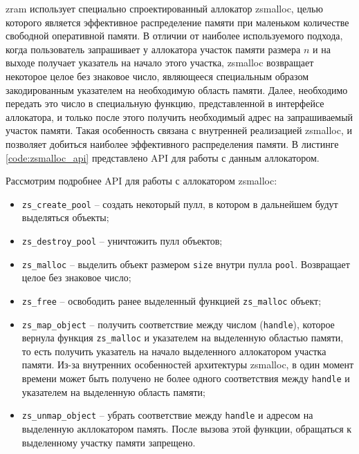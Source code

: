 \documentclass[12pt, a4paper]{article}
\begin{document}
zram использует специально спроектированный аллокатор zsmalloc, целью которого является эффективное распределение памяти при маленьком количестве свободной оперативной памяти. В отличии от наиболее используемого подхода, когда пользователь запрашивает у аллокатора участок памяти размера $n$ и на выходе получает указатель на начало этого участка, zsmalloc возвращает некоторое целое без знаковое число, являющееся специальным образом закодированным указателем на необходимую область памяти. Далее, необходимо передать это число в специальную функцию, представленной в интерфейсе аллокатора, и только после этого получить необходимый адрес на запрашиваемый участок памяти. Такая особенность связана с внутренней реализацией zsmalloc, и позволяет добиться наиболее эффективного распределения памяти. В листинге \ref{code:zsmalloc_api} представлено API для работы с данным аллокатором.


Рассмотрим подробнее API для работы с аллокатором zsmalloc:

\begin{itemize}
	\item \texttt{zs\_create\_pool} -- создать некоторый пулл, в котором в дальнейшем будут выделяться объекты;
	\item \texttt{zs\_destroy\_pool} -- уничтожить пулл объектов;
	\item \texttt{zs\_malloc} -- выделить объект размером \texttt{size} внутри пулла \texttt{pool}. Возвращает целое без знаковое число;
	\item \texttt{zs\_free} -- освободить ранее выделенный функцией \texttt{zs\_malloc} объект;
	\item \texttt{zs\_map\_object} -- получить соответствие между числом (\texttt{handle}), которое вернула функция \texttt{zs\_malloc} и указателем на выделенную областью памяти, то есть получить указатель на начало выделенного аллокатором участка памяти. Из-за внутренних особенностей архитектуры zsmalloc, в один момент времени может быть получено не более одного соответствия между \texttt{handle} и указателем на выделенную область памяти;
	\item \texttt{zs\_unmap\_object} -- убрать соответствие между \texttt{handle} и адресом на выделенную акллокатором память. После вызова этой функции, обращаться к выделенному участку памяти запрещено. 
\end{itemize}
\end{document}
